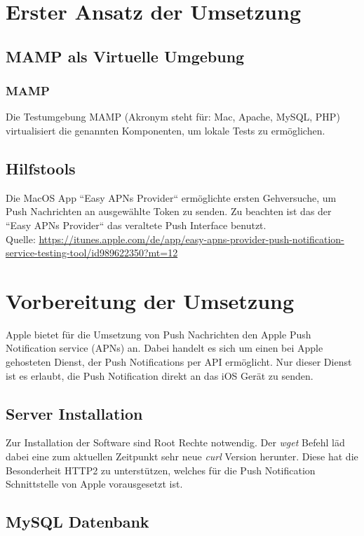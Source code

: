\newpage


\section{Erster Ansatz der Umsetzung}

\subsection{MAMP als Virtuelle Umgebung}

\subsubsection{MAMP}
Die Testumgebung MAMP (Akronym steht für: Mac, Apache, MySQL, PHP) virtualisiert die genannten Komponenten, um lokale Tests zu ermöglichen.

\subsection{Hilfstools}
Die MacOS App ``Easy APNs Provider`` ermöglichte ersten Gehversuche, um Push Nachrichten an ausgewählte Token zu senden.
Zu beachten ist das der ``Easy APNs Provider`` das veraltete Push Interface benutzt. 
\\
Quelle: \url{https://itunes.apple.com/de/app/easy-apns-provider-push-notification-service-testing-tool/id989622350?mt=12}

\section{Vorbereitung der Umsetzung}
Apple bietet für die Umsetzung von Push Nachrichten den Apple Push Notification service (APNs) an. Dabei handelt es sich um einen bei Apple gehosteten Dienst, der Push Notifications per API ermöglicht. Nur dieser Dienst ist es erlaubt, die Push Notification direkt an das iOS Gerät zu senden.


\subsection{Server Installation}
Zur Installation der Software sind Root Rechte notwendig. Der \textit{wget} Befehl läd dabei eine zum aktuellen Zeitpunkt sehr neue \textit{curl} Version herunter. Diese hat die Besonderheit HTTP2 zu unterstützen, welches für die Push Notification Schnittstelle von Apple vorausgesetzt ist.

\subsection{MySQL Datenbank}

